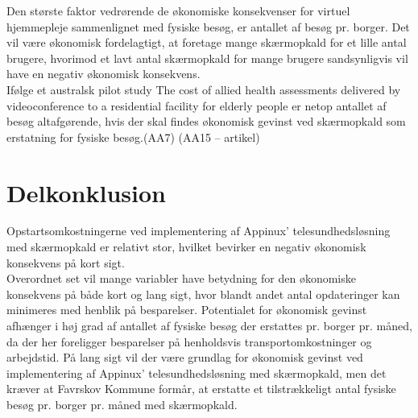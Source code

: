 Den største faktor vedrørende de økonomiske konsekvenser for virtuel hjemmepleje sammenlignet med fysiske besøg, er antallet af besøg pr. borger. Det vil være økonomisk fordelagtigt, at foretage mange skærmopkald for et lille antal brugere, hvorimod et lavt antal skærmopkald for mange brugere sandsynligvis vil have en negativ økonomisk konsekvens.\\
Ifølge et australsk pilot study The cost of allied health assessments delivered by videoconference to a residential facility for elderly people er netop antallet af besøg altafgørende, hvis der skal findes økonomisk gevinst ved skærmopkald som erstatning for fysiske besøg.(AA7)
(AA15 – artikel)
\section{Delkonklusion}
Opstartsomkostningerne ved implementering af Appinux' telesundhedsløsning med skærmopkald er relativt stor, hvilket bevirker en negativ økonomisk konsekvens på kort sigt.\\
Overordnet set vil mange variabler have betydning for den økonomiske konsekvens på både kort og lang sigt, hvor blandt andet antal opdateringer kan minimeres med henblik på besparelser. 
Potentialet for økonomisk gevinst afhænger i høj grad af antallet af fysiske besøg der erstattes pr. borger pr. måned, da der her foreligger besparelser på henholdsvis transportomkostninger og arbejdstid.
På lang sigt vil der være grundlag for økonomisk gevinst ved implementering af Appinux’ telesundhedsløsning med skærmopkald, men det kræver at Favrskov Kommune formår, at erstatte et tilstrækkeligt antal fysiske besøg pr. borger pr. måned med skærmopkald.